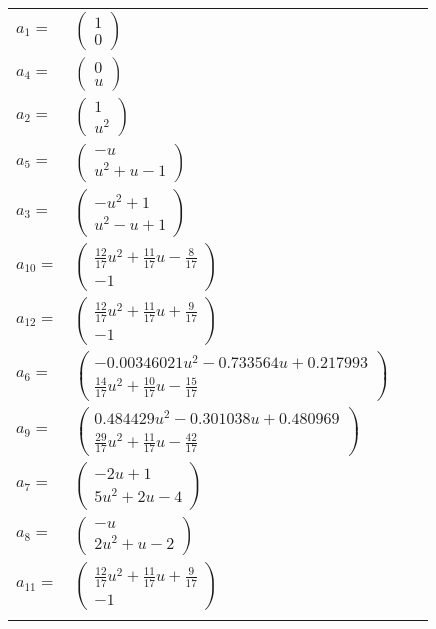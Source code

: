 \documentclass[1p]{elsarticle_modified}
\theoremstyle{definition}
\begin{document}
\begin{tabular}{m{7pt} m{180pt} m{7pt} m{180pt} }
\flushright $a_{1}=$&$\begin{pmatrix}1\\0\end{pmatrix}$ \\
\flushright $a_{4}=$&$\begin{pmatrix}0\\u\end{pmatrix}$ \\
\flushright $a_{2}=$&$\begin{pmatrix}1\\u^2\end{pmatrix}$ \\
\flushright $a_{5}=$&$\begin{pmatrix}- u\\u^2+u-1\end{pmatrix}$ \\
\flushright $a_{3}=$&$\begin{pmatrix}- u^2+1\\u^2- u+1\end{pmatrix}$ \\
\flushright $a_{10}=$&$\begin{pmatrix}\frac{12}{17} u^2+\frac{11}{17} u-\frac{8}{17}\\-1\end{pmatrix}$ \\
\flushright $a_{12}=$&$\begin{pmatrix}\frac{12}{17} u^2+\frac{11}{17} u+\frac{9}{17}\\-1\end{pmatrix}$ \\
\flushright $a_{6}=$&$\begin{pmatrix}-0.00346021 u^{2}-0.733564 u+0.217993\\\frac{14}{17} u^2+\frac{10}{17} u-\frac{15}{17}\end{pmatrix}$ \\
\flushright $a_{9}=$&$\begin{pmatrix}0.484429 u^{2}-0.301038 u+0.480969\\\frac{29}{17} u^2+\frac{11}{17} u-\frac{42}{17}\end{pmatrix}$ \\
\flushright $a_{7}=$&$\begin{pmatrix}-2 u+1\\5 u^2+2 u-4\end{pmatrix}$ \\
\flushright $a_{8}=$&$\begin{pmatrix}- u\\2 u^2+u-2\end{pmatrix}$ \\
\flushright $a_{11}=$&$\begin{pmatrix}\frac{12}{17} u^2+\frac{11}{17} u+\frac{9}{17}\\-1\end{pmatrix}$\\&\end{tabular}
\end{document}
